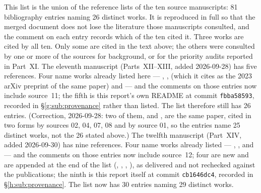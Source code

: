 \documentclass[11pt,a4paper]{article}
\numberwithin{equation}{section}
\theoremstyle{definition}
\theoremstyle{remark}
\theoremstyle{plain}
\begin{document}
This list is the union of the reference lists of the ten source
manuscripts: 81 bibliography entries naming 26 distinct works.  It is
reproduced in full so that the merged document does not lose the
literature those manuscripts consulted, and the comment on each entry
records which of the ten cited it.  Three works are cited by all ten.
Only some are cited in the text above; the others were consulted by one or
more of the sources for background, or for the priority audits reported in
Part~XI. The eleventh manuscript (Parts~XII--XIII, added 2026-09-28) has five
references. Four name works already listed here --- \cite{CPSS},
\cite{CSS13}, \cite{DDG} (which it cites as the 2023 arXiv preprint of the
same paper) and \cite{Perottib} --- and the
comments on those entries now include source~11; the fifth is this report's
own README at commit \texttt{fbba58593}, recorded in \S\ref{g:sub:provenance}
rather than listed. The list therefore still has 26 entries.
(Correction, 2026-09-28: two of them, \cite{Perottib} and \cite{Perotti},
are the same paper, cited in two forms by sources 02, 04, 07, 08 and by source 01, so the
entries name 25 distinct works, not the 26 stated above.)
The twelfth manuscript (Part~XIV, added 2026-09-30) has nine references.
Four name works already listed --- \cite{CSS}, \cite{CPSS}, \cite{Perottib}
and \cite{DMP} --- and the comments on those entries now include source~12;
four are new and are appended at the end of the list (\cite{Forster},
\cite{PV}, \cite{Vogt}, \cite{DV}), as delivered and not rechecked against
the publications; the ninth is this report itself at commit
\texttt{cb1646dc4}, recorded in \S\ref{h:sub:provenance}. The list now has
30 entries naming 29 distinct works.
\end{document}

